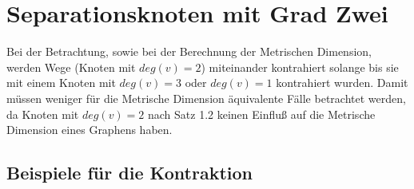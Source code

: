 \documentclass{article}
\begin{document}

\section{Separationsknoten mit Grad Zwei}
Bei der Betrachtung, sowie bei der Berechnung der Metrischen Dimension, werden Wege (Knoten mit $deg(v)=2$) miteinander kontrahiert solange bis sie mit einem Knoten mit $deg(v)=3$ oder $deg(v)=1$ kontrahiert wurden. Damit müssen weniger für die Metrische Dimension äquivalente Fälle betrachtet werden, da Knoten mit $deg(v)=2$ nach Satz 1.2 keinen Einfluß auf die Metrische Dimension eines Graphens haben.

\subsection{Beispiele für die Kontraktion}
\end{document}
